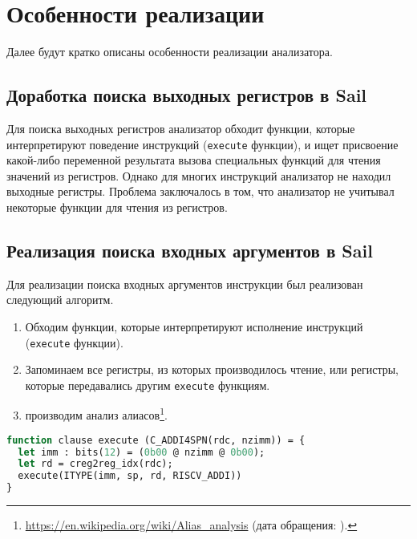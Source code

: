 
\section{Особенности реализации}

Далее будут кратко описаны особенности реализации анализатора.

\subsection{Доработка поиска выходных регистров в Sail}

Для поиска выходных регистров анализатор обходит функции, которые интерпретируют поведение инструкций (\texttt{execute} функции), и ищет присвоение какой-либо переменной результата вызова специальных функций для чтения значений из регистров. Однако для многих инструкций анализатор не находил выходные регистры. Проблема заключалось в том, что анализатор не учитывал некоторые функции для чтения из регистров.

\subsection{Реализация поиска входных аргументов в Sail}

Для реализации поиска входных аргументов инструкции был реализован следующий алгоритм.

\begin{enumerate}
      \item Обходим функции, которые интерпретируют исполнение инструкций (\texttt{execute} функции).
      \item Запоминаем все регистры, из которых производилось чтение, или регистры, которые передавались другим \texttt{execute} функциям.
      \item производим анализ алиасов\footnote{\url{https://en.wikipedia.org/wiki/Alias_analysis} (дата обращения: ).}.
\end{enumerate}

\begin{lstlisting}[caption={Пример функции, которая интерпретирует выполнение инструкции c.addi4spn}, language=Caml, frame=single, label=alias]
function clause execute (C_ADDI4SPN(rdc, nzimm)) = {
  let imm : bits(12) = (0b00 @ nzimm @ 0b00);
  let rd = creg2reg_idx(rdc);
  execute(ITYPE(imm, sp, rd, RISCV_ADDI))
}
\end{lstlisting}


